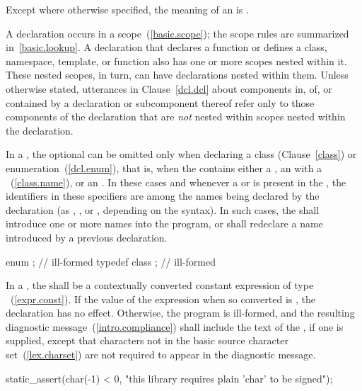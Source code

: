 \pnum
Except where otherwise specified, the meaning of an 
is .

\pnum
{}%
%
A declaration occurs in a scope~(\ref{basic.scope}); the scope rules are
summarized in~\ref{basic.lookup}. A declaration that declares a function
or defines a class, namespace, template, or function also has one or
more scopes nested within it. These nested scopes, in turn, can have
declarations nested within them. Unless otherwise stated, utterances in
Clause~\ref{dcl.dcl} about components in, of, or contained by a
declaration or subcomponent thereof refer only to those components of
the declaration that are \emph{not} nested within scopes nested within
the declaration.

\pnum
{}%
%
In a , the optional
 can be omitted only when declaring a
class (Clause~\ref{class}) or enumeration~(\ref{dcl.enum}), that is,
when the  contains either a
, an  with
a ~(\ref{class.name}), or an
. In these cases and whenever a
 or  is present in
the , the identifiers in these specifiers
are among the names being declared by the declaration (as
, , or
, depending on the syntax). In such cases,
the  shall introduce one or more names into
the program, or shall redeclare a name introduced by a previous
declaration.
\begin{example}

\begin{codeblock}
enum { };           // ill-formed
typedef class { };  //  ill-formed
\end{codeblock}
\end{example}

\pnum
{}%
In a , the
 shall be
a contextually converted constant expression
of type ~(\ref{expr.const}).
If the value of the expression when
so converted is , the declaration has no
effect. Otherwise, the program is ill-formed, and the resulting
diagnostic message~(\ref{intro.compliance}) shall include the text of
the , if one is supplied,
except that characters not in the basic
source character set~(\ref{lex.charset}) are not required to appear in
the diagnostic message.
\begin{example}

\begin{codeblock}
static_assert(char(-1) < 0, "this library requires plain 'char' to be signed");
\end{codeblock}\end{example}

